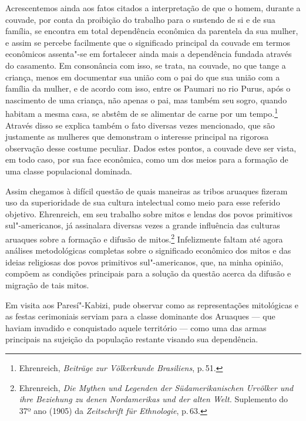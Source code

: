 Acrescentemos ainda aos fatos citados a interpretação de que o homem,
durante a couvade, por conta da proibição do trabalho para o sustendo
de si e de sua família, se encontra em total dependência econômica da
parentela da sua mulher, e assim se percebe facilmente que o
significado principal da couvade em termos econômicos assenta"-se em
fortalecer ainda mais a dependência fundada através do casamento. Em
consonância com isso, se trata, na couvade, no que tange a criança, menos
em documentar sua união com o pai do que sua união com a família da
mulher, e de acordo com isso, entre os Paumari no rio Purus, após o
nascimento de uma criança, não apenas o pai, mas também seu sogro,
quando habitam a mesma casa, se abstêm de se alimentar de carne por
um tempo.\footnote{Ehrenreich, \textit{Beiträge zur Völkerkunde Brasiliens}, p.\,51.} Através disso se explica também o fato diversas vezes
mencionado, que são justamente as mulheres que demonstram o interesse
principal na rigorosa observação desse costume peculiar. Dados estes pontos, 
a couvade deve ser vista, em todo caso, por sua face econômica,
como um dos meios para a formação de uma classe populacional dominada.

Assim chegamos à difícil questão de quais maneiras as tribos aruaques
fizeram uso da superioridade de sua cultura intelectual como meio para
esse referido objetivo. Ehrenreich, em seu trabalho sobre mitos e lendas
dos povos primitivos sul"-americanos, já assinalara diversas vezes a
grande influência das culturas aruaques sobre a formação e difusão de
mitos.\footnote{Ehrenreich, \textit{Die Mythen und Legenden der
  Südamerikanischen Urvölker und ihre Beziehung zu denen Nordamerikas
  und der alten Welt.} Suplemento do 37º ano (1905) da \textit{Zeitschrift
  für Ethnologie}, p.\,63.} Infelizmente faltam até agora análises 
  metodológicas completas sobre o significado econômico dos mitos e das
ideias religiosas dos povos primitivos sul"-americanos, que, na minha
opinião, compõem as condições principais para a solução da questão
acerca da difusão e migração de tais mitos.

Em visita aos Paresí"-Kabizi, pude observar como as
representações mitológicas e as festas cerimoniais serviam para a
classe dominante dos Aruaques --- que haviam invadido e conquistado
aquele território --- como uma das armas principais na sujeição da
população restante visando sua dependência.

